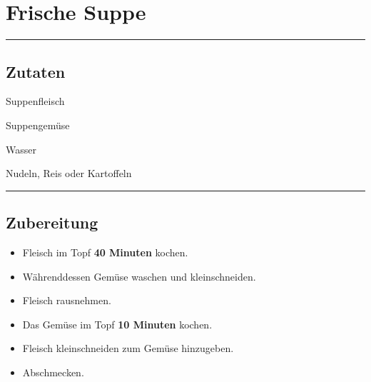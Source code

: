 \section*{Frische Suppe}

\bigbreak
\rule{\textwidth}{0.4pt}

\subsection*{Zutaten}

    \begin{description}[align=right,leftmargin=!,labelwidth=\widthof{\bfseries xxPrisen}]
        \item[500g] Suppenfleisch
        \item[1 Pkg] Suppengemüse
        \item[1,25l] Wasser
        \item[Beilage] Nudeln, Reis oder Kartoffeln
    \end{description}


\rule{\textwidth}{0.4pt}


\subsection*{Zubereitung}

\begin{itemize}
    \item Fleisch im Topf \textbf{40 Minuten} kochen.
    \item Währenddessen Gemüse waschen und kleinschneiden.
    \item Fleisch rausnehmen.
    \item Das Gemüse im Topf \textbf{10 Minuten} kochen.
    \item Fleisch kleinschneiden zum Gemüse hinzugeben.
    \item Abschmecken.
\end{itemize}
